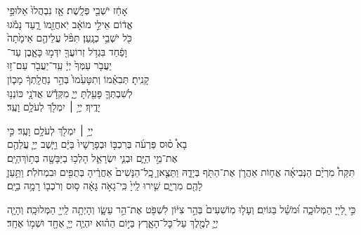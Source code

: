 \documentclass[twoside, openany, parskip=half, 11pt]{book}
\begin{document}
אָחַ֔ז יֹשְׁבֵ֖י פְּלָֽשֶׁת׃ \hfill אָ֤ז נִבְהֲלוּ֙ אַלּוּפֵ֣י \\
אֱד֔וֹם \hfill אֵילֵ֣י מוֹאָ֔ב יֹֽאחֲזֵ֖מוֹ רָ֑עַד \hfill נָמֹ֕גוּ \\
כֹּ֖ל יֹשְׁבֵ֥י כְנָֽעַן׃ \hfill תִּפֹּ֨ל עֲלֵיהֶ֤ם אֵימָ֙תָה֙ \\
וָפַ֔חַד \hfill בִּגְדֹ֥ל זְרוֹעֲךָ֖ יִדְּמ֣וּ כָּאָ֑בֶן \hfill עַד־\\
יַעֲבֹ֤ר עַמְּךָ֙ יְיָ֔ \hfill עַֽד־יַעֲבֹ֖ר עַם־ז֥וּ \\
קָנִֽיתָ׃ \hfill תְּבִאֵ֗מוֹ וְתִטָּעֵ֙מוֹ֙ בְּהַ֣ר נַחֲלָֽתְךָ֔ \hfill מָכ֧וֹן \\
לְשִׁבְתְּךָ֛ פָּעַ֖לְתָּ יְיָ֑ \hfill מִקְּדָ֕שׁ אֲדֹנָ֖י כּוֹנְנ֥וּ \\
יָדֶֽיךָ׃ \hfill יְיָ֥ ׀ יִמְלֹ֖ךְ לְעֹלָ֥ם וָעֶֽד׃\hfill \break
\begin{small}
\hfill יְיָ֥ ׀ יִמְלֹ֖ךְ לְעֹלָ֥ם וָעֶֽד׃ \hfill כִּ֣י \\
בָא֩ ס֨וּס פַּרְעֹ֜ה בְּרִכְבּ֤וֹ וּבְפָרָשָׁיו֙ בַּיָּ֔ם \hfill וַיָּ֧שֶׁב יְיָ֛ עֲלֵהֶ֖ם \\
אֶת־מֵ֣י הַיָּ֑ם \hfill וּבְנֵ֧י יִשְׂרָאֵ֛ל הָלְכ֥וּ בַיַּבָּשָׁ֖ה בְּת֥וֹךְ\hfill הַיָּֽם׃\\
ַתִּקַּח֩ מִרְיָ֨ם הַנְּבִיאָ֜ה אֲח֧וֹת אַהֲרֹ֛ן אֶת־הַתֹּ֖ף בְּיָדָ֑הּ וַתֵּצֶ֤אןָ כׇֽל־הַנָּשִׁים֙ אַחֲרֶ֔יהָ בְּתֻפִּ֖ים וּבִמְחֹלֹֽת׃ וַתַּ֥עַן לָהֶ֖ם מִרְיָ֑ם שִׁ֤ירוּ לַֽייָ֙ כִּֽי־גָאֹ֣ה גָּאָ֔ה ס֥וּס וְרֹכְב֖וֹ רָמָ֥ה בַיָּֽם׃\hfill\break 
\end{small}


כִּ֣י לַ֭ייָ֭ הַמְּלוּכָ֑ה וּ֝מֹשֵׁ֗ל בַּגּוֹיִֽם׃
וְעָל֤וּ מֽוֹשִׁעִים֙ בְּהַ֣ר צִיּ֔וֹן לִשְׁפֹּ֖ט אֶת־הַ֣ר עֵשָׂ֑ו וְהָיְתָ֥ה לַֽייָ֖ הַמְּלוּכָֽה׃
וְהָיָ֧ה יְיָ֛ לְמֶ֖לֶךְ עַל־כׇּל־הָאָ֑רֶץ בַּיּ֣וֹם הַה֗וּא יִהְיֶ֧ה יְיָ֛ אֶחָ֖ד וּשְׁמ֥וֹ אֶחָֽד׃
\end{document}
